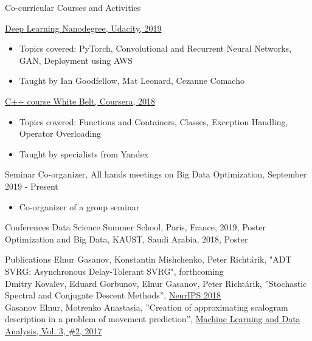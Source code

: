\documentclass{resume} %
\begin{document}
\begin{rSection}{Co-curricular Courses and Activities}

{\href{https://github.com/gaseln/deep-learning-v2-pytorch}{Deep Learning Nanodegree, Udacity, 2019}
\begin{itemize}
	\item Topics covered: PyTorch, Convolutional and Recurrent Neural Networks, GAN, Deployment using AWS
	\item Taught by Ian Goodfellow, Mat Leonard, Cezanne Comacho
\end{itemize}}
\href{https://github.com/gaseln/c-plus-plus-white}{C++ course White Belt, Coursera, 2018}
\begin{itemize}
	\item Topics covered: Functions and Containers, Classes, Exception Handling, Operator Overloading	\item Taught by specialists from Yandex
\end{itemize}
{Seminar Co-organizer, All hands meetings on Big Data Optimization, September 2019 - Present}
\begin{itemize}
	\item Co-organizer of a group seminar
\end{itemize}
\end{rSection}
\begin{rSection}{Conferences}
{Data Science Summer School, Paris, France, 2019, Poster}\\
{Optimization and Big Data, KAUST, Saudi Arabia, 2018, Poster}\\
\end{rSection}
\begin{rSection}{Publications}
{Elnur Gasanov, Konstantin Mishchenko, Peter Richt{\'a}rik, "ADT SVRG: Asynchronous Delay-Tolerant SVRG", forthcoming}\\
{Dmitry Kovalev, Eduard Gorbunov, Elnur Gasanov, Peter Richt{\'a}rik, ”Stochastic Spectral and Conjugate Descent Methods”, \href{https://papers.nips.cc/paper/7596-stochastic-spectral-and-conjugate-descent-methods}{NeurIPS 2018}}\\
{Gasanov Elnur, Motrenko Anastasia, ”Creation of approximating scalogram description in a problem of movement prediction”, \href{http://jmlda.org/papers/doc/2017/no2/Gasanov2017ECoGAnalysis.pdf}{Machine Learning and Data Analysis, Vol. 3, \#2, 2017}}
	
\end{rSection}
\end{document}
